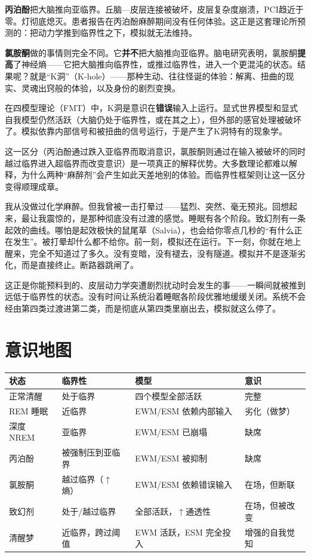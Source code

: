 \documentclass[11pt, twoside, openright]{book}
\begin{document}
\textbf{丙泊酚}把大脑推向亚临界。丘脑---皮层连接被破坏，皮层复杂度崩溃，PCI趋近于零。灯彻底熄灭。患者报告在丙泊酚麻醉期间没有任何体验。这正是这套理论所预测的：把动力学推到临界性之下，模拟就无法维持。

\textbf{氯胺酮}做的事情则完全不同。它\textbf{并不}把大脑推向亚临界。脑电研究表明，氯胺酮\textbf{提高}了神经熵------它把大脑推向临界性，或推过临界性，进入一个更混沌的状态。结果呢？就是“K洞”（K-hole）------那种生动、往往怪诞的体验：解离、扭曲的现实、灵魂出窍般的体验，以及身份的剧烈变换。

在四模型理论（FMT）中，K洞是意识在\textbf{错误}输入上运行。显式世界模型和显式自我模型仍然活跃（大脑仍处于临界性，或在其之上），但外部的感官处理被破坏了。模拟依靠内部信号和被扭曲的信号运行，于是产生了K洞特有的现象学。

这一区分（丙泊酚通过跌入亚临界而取消意识，氯胺酮则通过在输入被破坏的同时越过临界进入超临界而改变意识）是一项真正的解释优势。大多数理论都难以解释，为什么两种“麻醉剂”会产生如此天差地别的体验。而临界性框架则让这一区分变得顺理成章。

我从没做过化学麻醉。但我曾被一击打晕过------猛烈、突然、毫无预兆。回想起来，最让我震惊的，是那种彻底没有过渡的感觉。睡眠有各个阶段。致幻剂有一条起效的曲线。哪怕是起效极快的鼠尾草（Salvia），也会给你零点几秒的“有什么正在发生”。被打晕却什么都不给你。前一刻，模拟还在运行。下一刻，你就在地上醒来，完全不知道过了多久。没有变暗，没有褪去，没有隧道。模拟并不是逐渐劣化，而是直接终止。断路器跳闸了。

这正是你能预料到的、皮层动力学突遭剧烈扰动时会发生的事------一瞬间就被推到远低于临界性的状态。没有时间让系统沿着睡眠各阶段优雅地缓缓关闭。系统不会经由第四类过渡进第二类，而是彻底从第四类里崩出去，模拟就这么停了。

\section*{意识地图}


{\small
\noindent
\begin{tabularx}{\linewidth}{X X X X}
\toprule
\textbf{状态} & \textbf{临界性} & \textbf{模型} & \textbf{意识} \\
\midrule
正常清醒 & 处于临界 & 四个模型全部活跃 & 完整 \\[4pt]
REM 睡眠 & 近临界 & EWM/ESM 依赖内部输入 & 劣化（做梦） \\[4pt]
深度 NREM & 亚临界 & EWM/ESM 已崩塌 & 缺席 \\[4pt]
丙泊酚 & 被强制压到亚临界 & EWM/ESM 被抑制 & 缺席 \\[4pt]
氯胺酮 & 越过临界（$\uparrow$熵） & EWM/ESM 依赖错误输入 & 在场，但断联 \\[4pt]
致幻剂 & 处于/越过临界 & 全部活跃，$\uparrow$通透性 & 在场，但被改变 \\[4pt]
清醒梦 & 近临界，跨过阈值 & EWM 活跃，ESM 完全投入 & 增强的自我觉知 \\[4pt]
\bottomrule
\end{tabularx}
}
\end{document}
